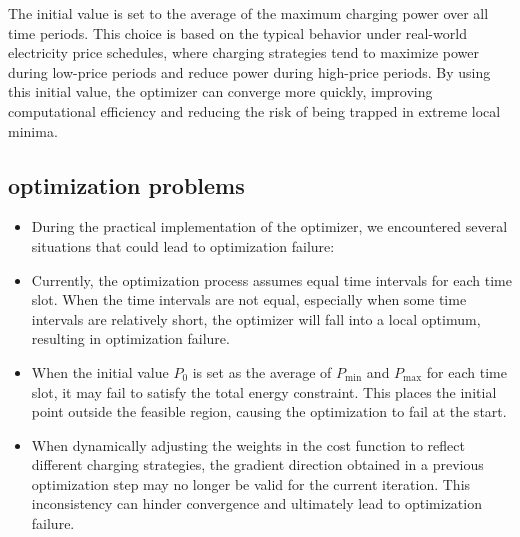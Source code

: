 \documentclass[
english,
ruledheaders=section,%
class=report,%
thesis={type=Report},%
accentcolor=9c,%
custommargins=true,%
marginpar=false,%
parskip=half-,%
fontsize=11pt,%
logofile={img/tuda_logo.pdf}, %
]{tudapub}
\begin{document}


    The initial value is set to the average of the maximum charging power over all time periods. This choice is based on the typical behavior under real-world electricity price schedules, where charging strategies tend to maximize power during low-price periods and reduce power during high-price periods. By using this initial value, the optimizer can converge more quickly, improving computational efficiency and reducing the risk of being trapped in extreme local minima.



    \subsection{optimization problems}




    \begin{itemize}
        \item During the practical implementation of the optimizer, we encountered several situations that could lead to optimization failure:

        \item Currently, the optimization process assumes equal time intervals for each time slot. When the time intervals are not equal, especially when some time intervals are relatively short, the optimizer will fall into a local optimum, resulting in optimization failure.

        \item When the initial value $P_0$ is set as the average of $P_{\min}$ and $P_{\max}$ for each time slot, it may fail to satisfy the total energy constraint. This places the initial point outside the feasible region, causing the optimization to fail at the start.

        \item When dynamically adjusting the weights in the cost function to reflect different charging strategies, the gradient direction obtained in a previous optimization step may no longer be valid for the current iteration. This inconsistency can hinder convergence and ultimately lead to optimization failure.

    \end{itemize}
\end{document}
